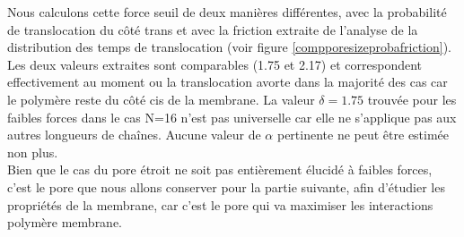 Nous calculons cette force seuil de deux manières différentes, avec la probabilité de translocation du côté trans et avec la friction extraite de l'analyse de la distribution des temps de translocation (voir figure \ref{compporesizeprobafriction}). Les deux valeurs extraites sont comparables (1.75 et 2.17) et correspondent effectivement au moment ou la translocation avorte dans la majorité des cas car le polymère reste du côté cis de la membrane. La valeur $\delta=1.75$ trouvée pour les faibles forces dans le cas N=16 n'est pas universelle car elle ne s'applique pas aux autres longueurs de chaînes. Aucune valeur de $\alpha$ pertinente ne peut être estimée non plus.\\

Bien que le cas du pore étroit ne soit pas entièrement élucidé à faibles forces, c'est le pore que nous allons conserver pour la partie suivante, afin d'étudier les propriétés de la membrane, car c'est le pore qui va maximiser les interactions polymère membrane.


%
%
%
%
%
%
%
%
%




